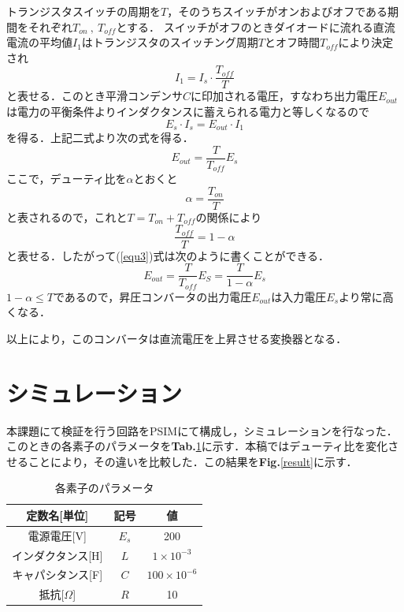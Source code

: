 \documentclass[a4paper,12pt]{jarticle}
\begin{document}
トランジスタスイッチの周期を$ T $，そのうちスイッチがオンおよびオフである期間をそれぞれ$ T_{on} ~ , ~ T_{off} $とする．
スイッチがオフのときダイオードに流れる直流電流の平均値$ I_1 $はトランジスタのスイッチング周期$ T $とオフ時間$ T_{off} $により決定され
%
\begin{equation}
 I_1 = I_s \cdot \dfrac{T_{off}}{T}
\label{equ1}
\end{equation}
%
と表せる．このとき平滑コンデンサ$ C $に印加される電圧，すなわち出力電圧$ E_{out} $は電力の平衡条件よりインダクタンスに蓄えられる電力と等しくなるので
%
\begin{equation}
 E_s \cdot I_s = E_{out} \cdot I_1
\label{equ2}
\end{equation}
%
を得る．上記二式より次の式を得る．
%
\begin{equation}
 E_{out} = \dfrac{T}{T_{off}} E_s
\label{equ3}
\end{equation}
%
ここで，デューティ比を$ \alpha $とおくと
%
\begin{equation}
 \alpha = \dfrac{T_{on}}{T}
\label{equ4}
\end{equation}
%
と表されるので，これと$ T = T_{on} + T_{off} $の関係により
%
\begin{equation}
 \dfrac{T_{off}}{T} = 1 - \alpha
\label{equ5}
\end{equation}
%
と表せる．したがって(\ref{equ3})式は次のように書くことができる．
%
\begin{equation}
 E_{out} = \dfrac{T}{T_{off}} E_S = \dfrac{T}{1 - \alpha} E_s
\end{equation}
%
$ 1 - \alpha \leq T $であるので，昇圧コンバータの出力電圧$ E_{out} $は入力電圧$ E_s $より常に高くなる．

以上により，このコンバータは直流電圧を上昇させる変換器となる．

\section{シミュレーション}
%
本課題にて検証を行う回路をPSIMにて構成し，シミュレーションを行なった．このときの各素子のパラメータを{\bf Tab.}\ref{param}に示す．本稿ではデューティ比を変化させることにより，その違いを比較した．この結果を{\bf Fig.}\ref{result}に示す．
%
\begin{table}[H]
  \begin{center}
    \caption{各素子のパラメータ}
    \begin{tabular}{c|c|c} \hline
      定数名[単位] & 記号 & 値 \\ \hline \hline
      電源電圧[V] & $ E_s $ & 200 \\ \hline
      インダクタンス[H]& $ L $ & $ 1 \times 10^{-3} $ \\ \hline
      キャパシタンス[F]& $ C $ & $ 100 \times 10^{-6} $\\ \hline
      抵抗[$\Omega$] & $ R $ & 10 \\ \hline
    \end{tabular}
    \label{param}
  \end{center}
\end{table}
\end{document}
